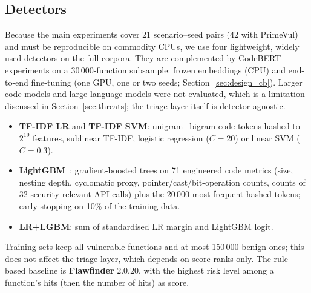 \subsection{Detectors}
Because the main experiments cover 21 scenario--seed pairs (42 with PrimeVul) and must be reproducible on commodity CPUs, we use four lightweight, widely used detectors on the full corpora. They are complemented by CodeBERT experiments on a 30\,000-function subsample: frozen embeddings (CPU) and end-to-end fine-tuning (one GPU, one or two seeds; Section~\ref{sec:design_cb}). Larger code models and large language models were not evaluated, which is a limitation discussed in Section~\ref{sec:threats}; the triage layer itself is detector-agnostic.
\begin{itemize}[itemsep=1pt]
\item \textbf{TF-IDF LR} and \textbf{TF-IDF SVM}: unigram+bigram code tokens hashed to $2^{19}$ features, sublinear TF-IDF, logistic regression ($C{=}20$) or linear SVM ($C{=}0.3$).
\item \textbf{LightGBM}~\cite{ke2017lightgbm}: gradient-boosted trees on 71 engineered code metrics (size, nesting depth, cyclomatic proxy, pointer/cast/bit-operation counts, counts of 32 security-relevant API calls) plus the 20\,000 most frequent hashed tokens; early stopping on 10\% of the training data.
\item \textbf{LR+LGBM}: sum of standardised LR margin and LightGBM logit.
\end{itemize}
Training sets keep all vulnerable functions and at most 150\,000 benign ones; this does not affect the triage layer, which depends on score ranks only.
The rule-based baseline is \textbf{Flawfinder} 2.0.20, with the highest risk level among a function's hits (then the number of hits) as score.

